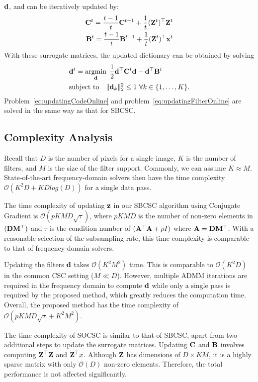 $\filter$, and can be iteratively updated by:
\begin{equation} \label{eq:updateSur}
\begin{split}
    \surC^t  = \frac{t-1}{t} \surC^{t-1} + \frac{1}{t}(\Code^t)^\top \Code^t \\
    \surB^t  = \frac{t-1}{t} \surB^{t-1} + \frac{1}{t}(\Code^t)^\top \signal^t
\end{split}
\end{equation}
With these surrogate matrices, the updated dictionary can be obtained
by solving
\begin{equation} \label{eq:updatingFilterOnline}
\begin{split}
    & \filter^t = \minimize{\filter} \frac{1}{2} \filter^\top \surC^t\filter - \filter^\top \surB^t \\& \text{subject to} \quad \|\filter_k\|_2^2 \leq 1 ~ \forall k \in \{1,\dots,K\}.
\end{split}
\end{equation}
Problem~\eqref{eq:updatingCodeOnline} and
problem~\eqref{eq:updatingFilterOnline} are solved in the same way as
that for SBCSC.

\subsection{Complexity Analysis}
Recall that $D$ is the number of pixels for a single image, $K$ is the
number of filters, and $M$ is the size of the filter
support. Commonly, we can assume $K \approx M$.  State-of-the-art
frequency-domain solvers then have the time complexity
$\mathcal{O}(K^2D + KDlog(D))$ for a single data pass.

The time complexity of updating $\code$ in our SBCSC algorithm using
Conjugate Gradient is $\mathcal{O}(pKMD \sqrt{\tau})$, where $pKMD$ is
the number of non-zero elements in $(\Filter \mask^\top)$ and $\tau$
is the condition number of $(\matA^\top \matA + \rho I)$ where $\matA
= \Filter \mask^\top$. With a reasonable selection of the subsampling
rate, this time complexity is comparable to that of frequency-domain
solvers.

Updating the filters $\filter$ takes $\mathcal{O}(K^2M^2)$ time. This
is comparable to $\mathcal{O}(K^2D)$ in the common CSC setting ($M \ll
D$). However, multiple ADMM iterations are required in the frequency
domain to compute $\filter$ while only a single pass is required by
the proposed method, which greatly reduces the computation
time. Overall, the proposed method has the time complexity of
$\mathcal{O}(pKMD \sqrt{\tau} + K^2M^2)$.

The time complexity of SOCSC is similar to that of SBCSC, apart from
two additional steps to update the surrogate matrices. Updating
$\surC$ and $\surB$ involves computing $\Code^\top\Code$ and
$\Code^\top x$. Although $\Code$ has dimensions of $D \times KM$, it
is a highly sparse matrix with only $\mathcal{O}(D)$ non-zero
elements. Therefore, the total performance is not affected
significantly.



